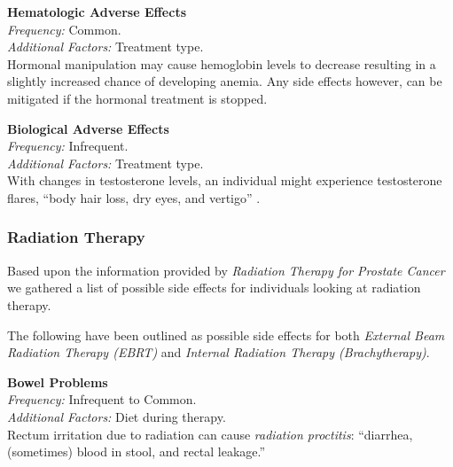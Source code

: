 \documentclass[journal]{vgtc}                %
\begin{document}
                        \textbf{Hematologic Adverse Effects}
                        \\ \textit{Frequency:} Common.
                        \\ \textit{Additional Factors:} Treatment type.
                        \\ Hormonal manipulation may cause hemoglobin levels to decrease resulting in a slightly increased chance of developing anemia. Any side effects however, can be mitigated if the hormonal treatment is stopped. \cite{AdverseEvents:2005}
                        \newline

                        \textbf{Biological Adverse Effects}
                        \\ \textit{Frequency:} Infrequent.
                        \\ \textit{Additional Factors:} Treatment type.
                        \\ With changes in testosterone levels, an individual might experience testosterone flares, ``body hair loss, dry eyes, and vertigo'' \cite{AdverseEvents:2005}.

                \subsubsection{Radiation Therapy}
                        Based upon the information provided by \textit{Radiation Therapy for Prostate Cancer}\cite{RadiationTherapy:2005} we gathered a list of possible side effects for individuals looking at radiation therapy.

                        The following have been outlined as possible side effects for both \textit{External Beam Radiation Therapy (EBRT)} and \textit{Internal Radiation Therapy (Brachytherapy)}.
                        \newline

                        \textbf{Bowel Problems}
                        \\ \textit{Frequency:} Infrequent to Common.
                        \\ \textit{Additional Factors:} Diet during therapy.
                        \\ Rectum irritation due to radiation can cause \textit{radiation proctitis}: ``diarrhea, (sometimes) blood in stool, and rectal leakage.'' \cite{RadiationTherapy:2005}
                        \newline
\end{document}
